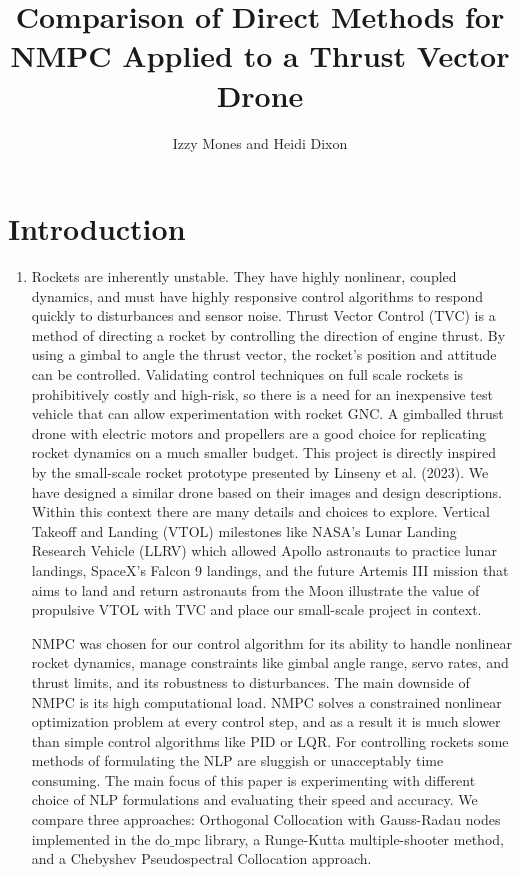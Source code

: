 \documentclass[]{article}
\title{Comparison of Direct Methods for NMPC  Applied to  a Thrust Vector Drone}
\author{Izzy Mones and Heidi Dixon}
\begin{document}
	\maketitle
	
	\section*{Introduction}	
	\begin{enumerate}
		\item 
		Rockets are inherently unstable. They have highly nonlinear, coupled dynamics, and must have highly responsive control algorithms to respond quickly to disturbances and sensor noise. Thrust Vector Control (TVC) is a method of directing a rocket by controlling the direction of engine thrust. By using a gimbal to angle the thrust vector, the rocket's position and attitude can be controlled. Validating control techniques on full scale rockets is prohibitively costly and high-risk, so there is a need for an inexpensive test vehicle that can allow experimentation with rocket GNC. A gimballed thrust drone with electric motors and propellers are a good choice for replicating rocket dynamics on a much smaller budget. This project is directly inspired by the small-scale rocket prototype presented by Linseny et al. (2023). We have designed a similar drone based on their images and design descriptions. Within this context there are many details and choices to explore. 
		Vertical Takeoff and Landing (VTOL) milestones like NASA's Lunar Landing Research Vehicle (LLRV) which allowed Apollo astronauts to practice lunar landings, SpaceX's Falcon 9 landings, and the future Artemis III mission that aims to land and return astronauts from the Moon illustrate the value of propulsive VTOL with TVC and place our small-scale project in context.
		
		NMPC was chosen for our control algorithm for its ability to handle nonlinear rocket dynamics, manage constraints like gimbal angle range, servo rates, and thrust limits, and its robustness to disturbances. The main downside of NMPC is its high computational load. NMPC solves a constrained nonlinear optimization problem at every control step, and as a result it is much slower than simple control algorithms like PID or LQR. For controlling rockets some methods of formulating the NLP are sluggish or unacceptably time consuming. The main focus of this paper is experimenting with different choice of NLP formulations and evaluating their speed and accuracy. We  compare three approaches: Orthogonal Collocation with Gauss-Radau nodes implemented in the $\text{do\_mpc}$ library, a Runge-Kutta multiple-shooter method, and a Chebyshev Pseudospectral Collocation approach.

	\end{enumerate}
	
\end{document}
